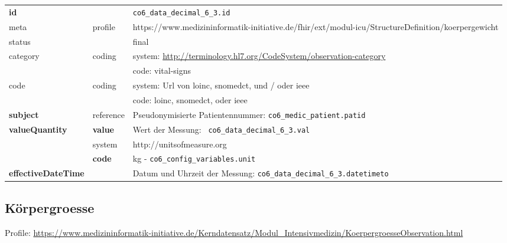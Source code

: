 \begin{longtable}{|l|l|p{7.5cm}|}
        \hline
        \rowcolor{lightgray} \multicolumn{3}{|l|}{Data Mapping (inhaltlich)} \\ \hline
        \textbf{id} &  & \texttt{co6\_data\_decimal\_6\_3.id} \\ \hline
	meta & profile & https://www.medizininformatik-initiative.de/fhir/ext/modul-icu/StructureDefinition/koerpergewicht \\ \hline 
	status &  & final   \\ \hline 
	category & coding & system: \url{http://terminology.hl7.org/CodeSystem/observation-category} \\
\cline{3-3}
	& & code: vital-signs \\ \hline
	code & coding & system: Url von \ac{loinc}, \ac{snomedct}, und / oder \ac{ieee} \\ 
	\cline{3-3} 
	 &  & code: \ac{loinc}, \ac{snomedct}, oder \ac{ieee} \\ \hline
	 \textbf{subject}  & reference & Pseudonymisierte Patientennummer: \texttt{co6\_medic\_patient.patid} \\ \hline
	 \textbf{valueQuantity}  & \textbf{value} & Wert der Messung: \texttt{
co6\_data\_decimal\_6\_3.val} \\
        \cline{2-3}
         & system & http://unitsofmeasure.org \\
         \cline{2-3}
         & \textbf{code} & kg - \texttt{co6\_config\_variables.unit} \\ \hline
     \textbf{effectiveDateTime}  & & Datum und Uhrzeit der Messung: \texttt{co6\_data\_decimal\_6\_3.datetimeto} \\ \hline
\end{longtable}


\subsection{Körpergroesse} 
Profile: \url{https://www.medizininformatik-initiative.de/Kerndatensatz/Modul_Intensivmedizin/KoerpergroesseObservation.html}

